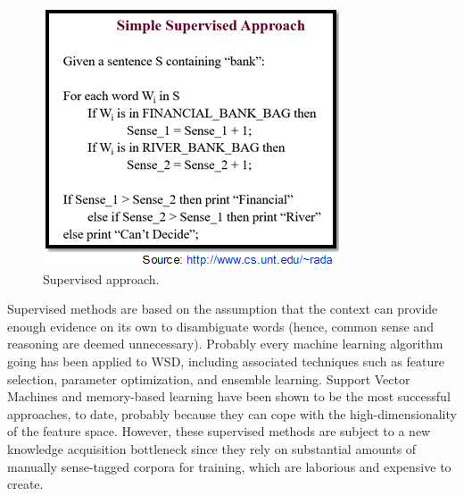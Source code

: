 \begin{figure}[tbh]
	\begin{center}
		\includegraphics[width=\columnwidth]{union(sup3)}
	\end{center}
	\caption{Supervised approach.}
\end{figure}
Supervised methods are based on the assumption that the context can provide enough evidence on its own to disambiguate words (hence, common sense and reasoning are deemed unnecessary). Probably every machine learning algorithm going has been applied to WSD, including associated techniques such as feature selection, parameter optimization, and ensemble learning. Support Vector Machines and memory-based learning have been shown to be the most successful approaches, to date, probably because they can cope with the high-dimensionality of the feature space. However, these supervised methods are subject to a new knowledge acquisition bottleneck since they rely on substantial amounts of manually sense-tagged corpora for training, which are laborious and expensive to create.
